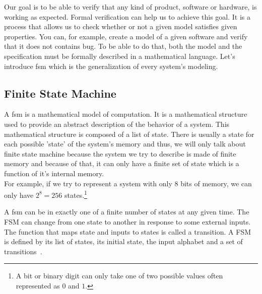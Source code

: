 \documentclass[12pt]{article}
\begin{document}
Our goal is to be able to verify that any kind of product, software or hardware, is working as expected. Formal verification can help us to achieve this goal. It is a process that allows us to check whether or not a given model satisfies given properties. You can, for example, create a model of a given software and verify that it does not contains bug. To be able to do that, both the model and the specification must be formally described in a mathematical language. Let's introduce \gls{fsm} which is the generalization of every system's modeling.\\



\subsection{Finite State Machine}

A \gls{fsm} is a mathematical model of computation. It is a mathematical structure used to provide an abstract description of the behavior of a system. This mathematical structure is composed of a list of state. There is usually a state for each possible 'state' of the system's memory and thus, we will only talk about finite state machine because the system we try to describe is made of finite memory and because of that, it can only have a finite set of state which is a function of it's internal memory.\\

For example, if we try to represent a system with only 8 bits of memory, we can only have $2^8 = 256$ states.\footnote{A bit or binary digit can only take one of two possible values often represented as $0$ and $1$.}

A \gls{fsm} can be in exactly one of a finite number of states at any given time. The FSM can change from one state to another in response to some external inputs. The function that maps state and inputs to states is called a transition. A FSM is defined by its list of states, its initial state, the input alphabet and a set of transitions~\cite{FSM:2017}.\\
\end{document}

